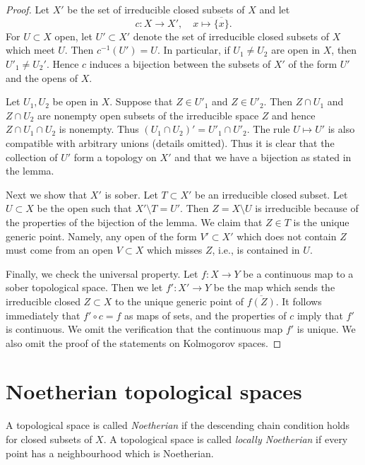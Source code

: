 \begin{proof}
Let $X'$ be the set of irreducible closed subsets of $X$ and let
$$
c : X \to X', \quad x \mapsto \overline{\{x\}}.
$$
For $U \subset X$ open, let $U' \subset X'$ denote the set
of irreducible closed subsets of $X$ which meet $U$.
Then $c^{-1}(U') = U$. In particular, if $U_1 \not = U_2$ are open in
$X$, then $U'_1 \not = U_2'$. Hence $c$ induces
a bijection between the subsets of $X'$ of the form $U'$ and the
opens of $X$.

\medskip\noindent
Let $U_1, U_2$ be open in $X$. Suppose that $Z \in U'_1$ and
$Z \in U'_2$. Then $Z \cap U_1$ and $Z \cap U_2$ are nonempty
open subsets of the irreducible space $Z$ and hence $Z \cap U_1 \cap U_2$
is nonempty. Thus $(U_1 \cap U_2)' = U'_1 \cap U'_2$.
The rule $U \mapsto U'$ is also compatible with arbitrary unions
(details omitted). Thus it is clear that the collection of
$U'$ form a topology on $X'$ and that we have a bijection as
stated in the lemma.

\medskip\noindent
Next we show that $X'$ is sober. Let $T \subset X'$ be an irreducible
closed subset. Let $U \subset X$ be the open such that $X' \setminus T = U'$.
Then $Z = X \setminus U$ is irreducible because of the properties
of the bijection of the lemma. We claim that $Z \in T$ is the unique generic
point. Namely, any open of the form $V' \subset X'$
which does not contain $Z$ must come from an open $V \subset X$
which misses $Z$, i.e., is contained in $U$.

\medskip\noindent
Finally, we check the universal property. Let $f : X \to Y$ be a continuous
map to a sober topological space. Then we let $f' : X' \to Y$ be the map
which sends the irreducible closed $Z \subset X$ to the unique generic
point of $\overline{f(Z)}$. It follows immediately that
$f' \circ c = f$ as maps of sets, and the properties of $c$ imply that
$f'$ is continuous. We omit the verification that the continuous
map $f'$ is unique. We also omit the proof of the statements on
Kolmogorov spaces.
\end{proof}



\section{Noetherian topological spaces}
\label{section-noetherian}

\begin{definition}
\label{definition-noetherian}
A topological space is called {\it Noetherian}
if the descending chain condition holds for
closed subsets of $X$. A topological space is called
{\it locally Noetherian} if every point has a neighbourhood
which is Noetherian.
\end{definition}

